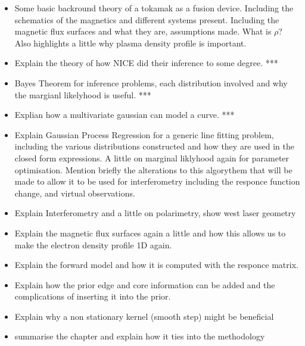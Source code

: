 
\begin{itemize}
    \item Some basic backround theory of a tokamak as a fusion device. Including the schematics of the magnetics and different systems present. Including the magnetic flux surfaces and what they are, assumptions made. What is $\rho$? Also highlights a little why plasma density profile is important. 
    \item Explain the theory of how NICE did their inference to some degree. ***
    \item Bayes Theorem for inference problems, each distribution involved and why the margianl likelyhood is useful. ***
    \item Explian how a multivariate gaussian can model a curve. ***
    \item Explain Gaussian Process Regression for a generic line fitting problem, including the various distributions constructed and how they are used in the closed form expressions. A little on marginal liklyhood again for parameter optimisation. Mention briefly the alterations to this algorythem that will be made to allow it to be used for interferometry including the responce function change, and virtual observations.
    \item Explain Interferometry and a little on polarimetry, show west laser geometry
    \item Explain the magnetic flux surfaces again a little and how this allows us to make the electron density profile 1D again.
    \item Explain the forward model and how it is computed with the responce matrix.
    \item Explain how the prior edge and core information can be added and the complications of inserting it into the prior.
    \item Explain why a non stationary kernel (smooth step) might be beneficial 
    \item summarise the chapter and explain how it ties into the methodology
\end{itemize}





